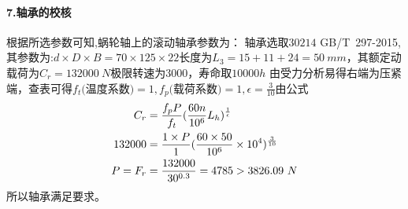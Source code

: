 \documentclass[UTF8,11pt,a4paper,oneside,final,zihao=-4,]{ctexrep}%
\newcommand{\two}[1]{\num[round-mode=places,round-precision=2] #1} %
\begin{document}
	\paragraph{7.轴承的校核}
	根据所选参数可知,蜗轮轴上的滚动轴承参数为：
		轴承选取$30214$ GB/T\ 297-2015,其参数为:$d\times D \times B=70\times125\times22$长度为$L_3=15+11+24=50\ mm$，其额定动载荷为$C_r=132000\ N$极限转速为3000，寿命取$10000h$	由受力分析易得右端为压紧端，查表可得$f_t\text{(温度系数)}=1,f_p\text{(载荷系数)}=1,\epsilon=\frac{3}{10}$由公式
	\begin{align*}
		C_r &= \frac{f_pP}{f_t}(\frac{60n}{10^6}L_h)^{\frac{1}{\epsilon}} \\
		132000 &= \frac{1\times P}{1}(\frac{60\times 50}{10^6}\times 10^4)^{\frac{3}{10}} \\
		P=F_r &= \frac{132000}{30^{0.3}}=4785> \two{\FtII}\ N
	\end{align*}
	所以轴承满足要求。
	
	
\end{document}
